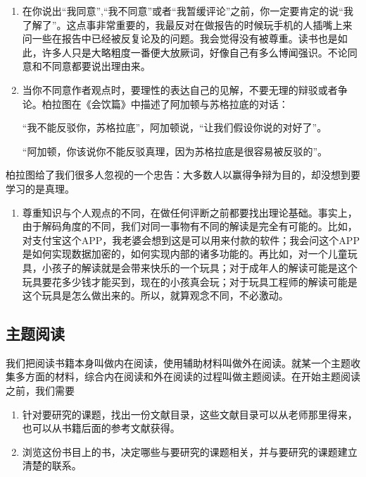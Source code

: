\documentclass[10pt,a4paper,UTF8]{article}
\begin{document}
\begin{enumerate}
\item 在你说出“我同意”,“我不同意”或者“我暂缓评论”之前，你一定要肯定的说“我了解了”。这点事非常重要的，我最反对在做报告的时候玩手机的人插嘴上来问一些在报告中已经被反复论及的问题。我会觉得没有被尊重。读书也是如此，许多人只是大略粗度一番便大放厥词，好像自己有多么博闻强识。不论同意和不同意都要说出理由来。

\item 当你不同意作者观点时，要理性的表达自己的见解，不要无理的辩驳或者争论。柏拉图在《会饮篇》中描述了阿加顿与苏格拉底的对话：

“我不能反驳你，苏格拉底”，阿加顿说，“让我们假设你说的对好了”。

“阿加顿，你该说你不能反驳真理，因为苏格拉底是很容易被反驳的”。
\end{enumerate}

柏拉图给了我们很多人忽视的一个忠告：大多数人以赢得争辩为目的，却没想到要学习的是真理。

\begin{enumerate}
\item 尊重知识与个人观点的不同，在做任何评断之前都要找出理论基础。事实上，由于解码角度的不同，我们对同一事物有不同的解读是完全有可能的。比如，对支付宝这个APP，我老婆会想到这是可以用来付款的软件；我会问这个APP是如何实现数据加密的，如何实现内部的诸多功能的。再比如，对一个儿童玩具，小孩子的解读就是会带来快乐的一个玩具；对于成年人的解读可能是这个玩具要花多少钱才能买到，现在的小孩真会玩；对于玩具工程师的解读可能是这个玩具是怎么做出来的。所以，就算观念不同，不必激动。
\end{enumerate}


\subsection{主题阅读}
\label{sec:orgheadline8}


我们把阅读书籍本身叫做内在阅读，使用辅助材料叫做外在阅读。就某一个主题收集多方面的材料，综合内在阅读和外在阅读的过程叫做主题阅读。在开始主题阅读之前，我们需要

\begin{enumerate}
\item 针对要研究的课题，找出一份文献目录，这些文献目录可以从老师那里得来，也可以从书籍后面的参考文献获得。

\item 浏览这份书目上的书，决定哪些与要研究的课题相关，并与要研究的课题建立清楚的联系。
\end{enumerate}
\end{document}
